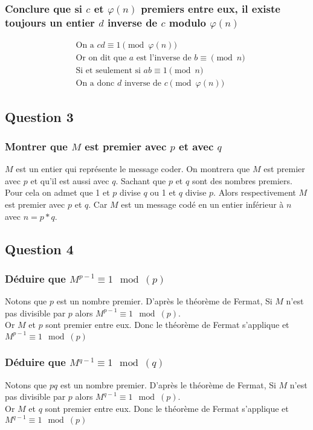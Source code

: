 \documentclass[a4paper,10pt]{article}
\begin{document}
\subsubsection{Conclure que si $c$ et $\varphi(n)$ premiers entre eux, il existe toujours un entier $d$ inverse de $c$ modulo $\varphi(n)$}

\begin{align*}
&\text{On a } cd \equiv 1 \pmod{\varphi(n)}\\
&\text{Or on dit que $a$ est l'inverse de $b \equiv \pmod n$}\\
&\text{Si et seulement si $ab \equiv 1 \pmod n$}\\
&\text{On a donc $d$ inverse de $c \pmod{\varphi(n)}$}
\end{align*}

\subsection{Question 3}
\subsubsection{Montrer que $M$ est premier avec $p$ et avec $q$}
$M$ est un entier qui représente le message coder. On montrera que $M$ est premier avec $p$ et qu’il est aussi avec $q$.
Sachant que $p$ et $q$ sont des nombres premiers.
Pour cela on admet que 1 et $p$ divise $q$ ou 1 et $q$ divise $p$. Alors respectivement $M$ est premier avec $p$ et $q$. Car $M$ est un message codé en un entier inférieur à $n$ avec $n = p*q$.


\subsection{Question 4}
\subsubsection{Déduire que $M^{p-1} \equiv 1 \mod(p)$}
Notons que $p$ est un nombre premier.
D'après le théorème de Fermat, Si $M$ n’est pas divisible par $p$ alors $M^{p-1} \equiv 1 \mod(p)$.\\
Or $M$ et $p$ sont premier entre eux.
Donc le théorème de Fermat s'applique et $M^{p-1} \equiv 1 \mod(p)$

\subsubsection{Déduire que $M^{q-1} \equiv 1 \mod(q)$}
Notons que $pq$ est un nombre premier.
D'après le théorème de Fermat, Si $M$ n’est pas divisible par $p$ alors $M^{q-1} \equiv 1 \mod(p)$.\\
Or $M$ et $q$ sont premier entre eux.
Donc le théorème de Fermat s'applique et $M^{q-1} \equiv 1 \mod(p)$
\end{document}
